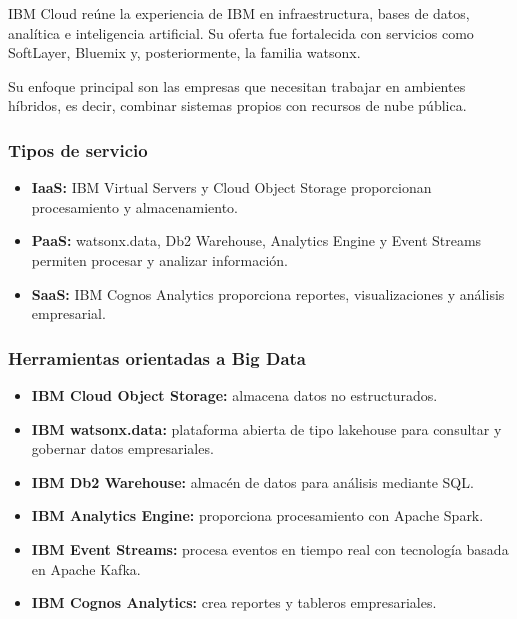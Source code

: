 IBM Cloud reúne la experiencia de IBM en infraestructura, bases de datos,
analítica e inteligencia artificial. Su oferta fue fortalecida con servicios
como SoftLayer, Bluemix y, posteriormente, la familia watsonx.

Su enfoque principal son las empresas que necesitan trabajar en ambientes
híbridos, es decir, combinar sistemas propios con recursos de nube pública.

\subsubsection*{Tipos de servicio}

\begin{itemize}
    \item \textbf{IaaS:} IBM Virtual Servers y Cloud Object Storage proporcionan
    procesamiento y almacenamiento.
    
    \item \textbf{PaaS:} watsonx.data, Db2 Warehouse, Analytics Engine y Event
    Streams permiten procesar y analizar información.
    
    \item \textbf{SaaS:} IBM Cognos Analytics proporciona reportes,
    visualizaciones y análisis empresarial.
\end{itemize}

\subsubsection*{Herramientas orientadas a Big Data}

\begin{itemize}
    \item \textbf{IBM Cloud Object Storage:} almacena datos no estructurados.
    
    \item \textbf{IBM watsonx.data:} plataforma abierta de tipo lakehouse para
    consultar y gobernar datos empresariales.
    
    \item \textbf{IBM Db2 Warehouse:} almacén de datos para análisis mediante SQL.
    
    \item \textbf{IBM Analytics Engine:} proporciona procesamiento con Apache
    Spark.
    
    \item \textbf{IBM Event Streams:} procesa eventos en tiempo real con
    tecnología basada en Apache Kafka.
    
    \item \textbf{IBM Cognos Analytics:} crea reportes y tableros empresariales.
\end{itemize}

